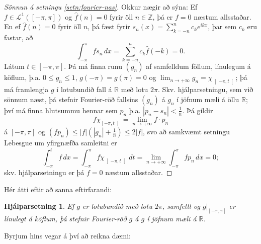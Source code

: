 \documentclass[a4paper,icelandic,11pt]{book}
\theoremstyle{plain}      \newtheorem{setn}{Setning}[chapter]
\newtheorem{lemma}[setn]{Hjálparsetning}
\theoremstyle{definition} \newtheorem{skilgr}[setn]{Skilgreining}
\theoremstyle{remark}     \newtheorem*{ath}{Athugasemd}
\newcommand{\R}{\mathbb R}
\newcommand{\Z}{\mathbb Z}
\begin{document}
\begin{proof}
  [Sönnun á setningu \ref{setn:fourier-nas}]
  Okkur nægir að sýna: Ef $f\in\mathcal L^{1}([-\pi,\pi])$ og $\hat
  f(n)=0$ fyrir öll $n\in\Z$, þá er $f=0$ næstum allsstaðar. En ef
  $\hat f(n) = 0$ fyrir öll $n$, þá fæst fyrir
  $s_{n}(x)=\sum_{k=-n}^{n}c_{k}e^{ikx}$, þar sem $c_{k}$ eru fastar,
  að 
  \[
  \int_{-\pi}^{\pi}fs_{n}\,dx
  = \sum_{k=-n}^{n}c_{k}\hat f(-k)
  = 0.
  \]
  Látum $t\in[-\pi,\pi]$. Þá má finna runu $(g_{n})$ af samfelldum
  föllum, línulegum á köflum, þ.a. $0\le g_{n}\le 1$,
  $g(-\pi)=g(\pi)=0$ og $\lim_{n\to +\infty}g_{n} =
  \chi_{\left]-\pi,t\right[}$; þá má framlengja $g$ í lotubundið fall
  á $\R$ með lotu $2\pi$. Skv. hjálparsetningu, sem við sönnum næst,
  þá stefnir Fourier-röð fallsins $(g_{n})$ á $g_{n}$ í jöfnum mæli á
  öllu $\R$; því má finna hlutsummu hennar sem $p_{n}$
  þ.a. $|p_{n}-s_{n}|<\frac 1n$. Þá gildir 
  \[
  f\chi_{\left[-\pi,t\right[}
  = \lim_{n\to +\infty}f\cdot p_{n}
  \]
  á $[-\pi,\pi]$ og $(fp_{n})\le|f|(|g_{n}|+\frac 1n)\le 2|f|$, svo að
  samkvæmt setningu Lebesgue um yfirgnæfða samleitni er 
  \[
  \int_{-\pi}^{t}f\,dx
  = \int_{-\pi}^{\pi}f\chi_{\left]-\pi,t\right[}\,dt
  = \lim_{n\to +\infty}\int_{-\pi}^{\pi}fp_{n}\,dx
  = 0;
  \]
  skv. hjálparsetningu er þá $f=0$ næstum allsstaðar.
\end{proof}
Hér átti eftir að sanna eftirfarandi:
\begin{lemma}
  \label{setn:fourier-lemma}
  Ef $g$ er lotubundið með lotu $2\pi$, samfellt og $g|_{[-\pi,\pi]}$
  er línulegt á köflum, þá stefnir Fourier-röð $g$ á $g$ í jöfnum mæli
  á $\R$.
\end{lemma}
Byrjum hins vegar á því að reikna dæmi:
\end{document}
